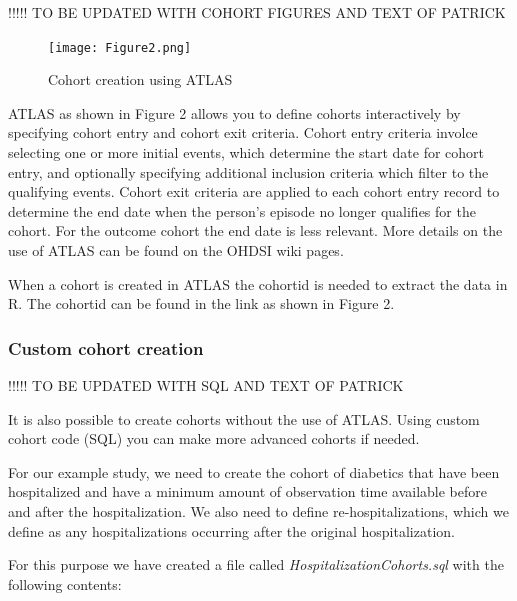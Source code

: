 \documentclass[]{article}
\begin{document}
!!!!! TO BE UPDATED WITH COHORT FIGURES AND TEXT OF PATRICK

\begin{figure}
\centering
\texttt{[image: Figure2.png]}
\caption{Cohort creation using ATLAS}
\end{figure}

ATLAS as shown in Figure 2 allows you to define cohorts interactively by
specifying cohort entry and cohort exit criteria. Cohort entry criteria
involce selecting one or more initial events, which determine the start
date for cohort entry, and optionally specifying additional inclusion
criteria which filter to the qualifying events. Cohort exit criteria are
applied to each cohort entry record to determine the end date when the
person's episode no longer qualifies for the cohort. For the outcome
cohort the end date is less relevant. More details on the use of ATLAS
can be found on the OHDSI wiki pages.

When a cohort is created in ATLAS the cohortid is needed to extract the
data in R. The cohortid can be found in the link as shown in Figure 2.

\subsubsection{Custom cohort creation}\label{custom-cohort-creation}

!!!!! TO BE UPDATED WITH SQL AND TEXT OF PATRICK

It is also possible to create cohorts without the use of ATLAS. Using
custom cohort code (SQL) you can make more advanced cohorts if needed.

For our example study, we need to create the cohort of diabetics that
have been hospitalized and have a minimum amount of observation time
available before and after the hospitalization. We also need to define
re-hospitalizations, which we define as any hospitalizations occurring
after the original hospitalization.

For this purpose we have created a file called
\emph{HospitalizationCohorts.sql} with the following contents:
\end{document}
